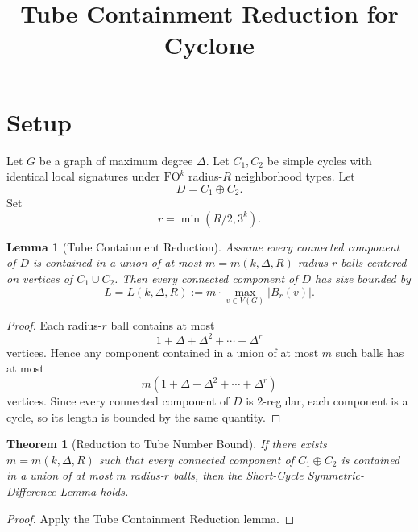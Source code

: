 \documentclass[11pt]{article}
\title{Tube Containment Reduction for Cyclone}
\date{}
\newtheorem{lemma}{Lemma}
\newtheorem{theorem}{Theorem}
\begin{document}
\maketitle

\section*{Setup}

Let \(G\) be a graph of maximum degree \(\Delta\).  
Let \(C_1,C_2\) be simple cycles with identical local signatures under
\(\mathrm{FO}^k\) radius-\(R\) neighborhood types.  
Let
\[
D = C_1 \oplus C_2 .
\]
Set
\[
r=\min(R/2,3^k).
\]

\begin{lemma}[Tube Containment Reduction]
Assume every connected component of \(D\) is contained in a union of at most
\(m=m(k,\Delta,R)\) radius-\(r\) balls centered on vertices of \(C_1\cup C_2\).
Then every connected component of \(D\) has size bounded by
\[
L=L(k,\Delta,R):=m \cdot \max_{v\in V(G)} |B_r(v)|.
\]
\end{lemma}

\begin{proof}
Each radius-\(r\) ball contains at most
\[
1+\Delta+\Delta^2+\cdots+\Delta^r
\]
vertices. Hence any component contained in a union of at most \(m\) such balls
has at most
\[
m(1+\Delta+\Delta^2+\cdots+\Delta^r)
\]
vertices. Since every connected component of \(D\) is 2-regular, each component
is a cycle, so its length is bounded by the same quantity.
\end{proof}

\begin{theorem}[Reduction to Tube Number Bound]
If there exists \(m=m(k,\Delta,R)\) such that every connected component of
\(C_1\oplus C_2\) is contained in a union of at most \(m\) radius-\(r\) balls,
then the Short-Cycle Symmetric-Difference Lemma holds.
\end{theorem}

\begin{proof}
Apply the Tube Containment Reduction lemma.
\end{proof}
\end{document}
